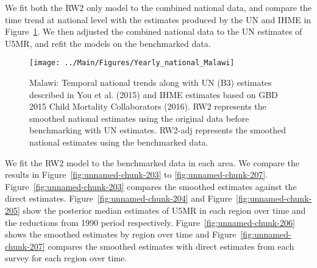\documentclass[12pt]{article}\usepackage[]{graphicx}\usepackage[]{color}
\newenvironment{knitrout}{}{} %
\begin{document}
We fit both the RW2 only model to the combined national data, and compare the time trend at national level with the estimates produced by the UN and IHME in Figure~\ref{fig:unnamed-chunk-202}. We then adjusted the combined national data to the UN estimates of U5MR, and refit the models on the benchmarked data. 

\begin{knitrout}
\color{fgcolor}\begin{figure}[bht]

{\centering \texttt{[image: ../Main/Figures/Yearly\_national\_Malawi]} 

}

\caption[Malawi]{Malawi: Temporal national trends along with UN (B3) estimates described in You et al. (2015) and IHME estimates based on GBD 2015 Child Mortality Collaborators (2016). RW2 represents the smoothed national estimates using the original data before benchmarking with UN estimates. RW2-adj represents the smoothed national estimates using the benchmarked data.}\label{fig:unnamed-chunk-202}
\end{figure}


\end{knitrout}
 

We fit the RW2 model to the benchmarked data in each area. 
We compare the results in Figure~\ref{fig:unnamed-chunk-203} to \ref{fig:unnamed-chunk-207}.
Figure~\ref{fig:unnamed-chunk-203} compares the smoothed estimates against the direct estimates. Figure~\ref{fig:unnamed-chunk-204} and Figure~\ref{fig:unnamed-chunk-205} show the posterior median estimates of U5MR in each region over time and the reductions from 1990 period respectively.
Figure~\ref{fig:unnamed-chunk-206} shows the smoothed estimates by region over time and Figure~\ref{fig:unnamed-chunk-207} compares the smoothed estimates with direct estimates from each survey for each region over time.




\end{document}

